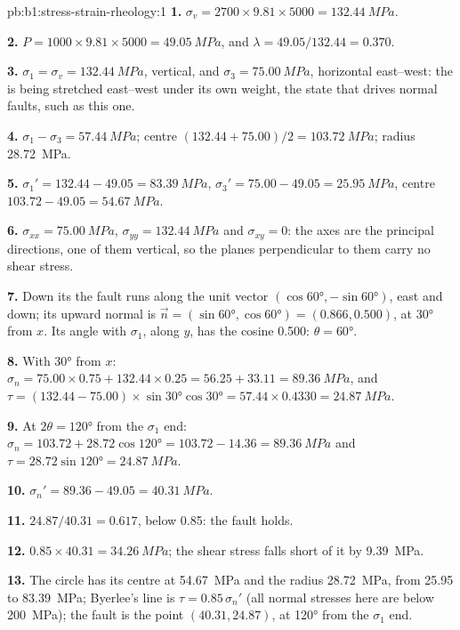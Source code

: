\begin{solution}{pb:b1:stress-strain-rheology:1}
\textbf{1.} $\sigma_v = 2700\times9.81\times5000 = \qty{132.44}{MPa}$.

\textbf{2.} $P = 1000\times9.81\times5000 = \qty{49.05}{MPa}$, and
$\lambda = 49.05/132.44 = 0.370$.

\textbf{3.} $\sigma_1 = \sigma_v = \qty{132.44}{MPa}$, vertical, and
$\sigma_3 = \qty{75.00}{MPa}$, horizontal east--west: the  is being
stretched east--west under its own weight, the state that drives normal
faults, such as this one.

\textbf{4.} $\sigma_1 - \sigma_3 = \qty{57.44}{MPa}$; centre
$(132.44 + 75.00)/2 = \qty{103.72}{MPa}$; radius \qty{28.72}{MPa}.

\textbf{5.} $\sigma_1' = 132.44 - 49.05 = \qty{83.39}{MPa}$, $\sigma_3' =
75.00 - 49.05 = \qty{25.95}{MPa}$, centre $103.72 - 49.05 = \qty{54.67}{MPa}$.

\textbf{6.} $\sigma_{xx} = \qty{75.00}{MPa}$, $\sigma_{yy} = \qty{132.44}{MPa}$
and $\sigma_{xy} = 0$: the axes are the principal directions, one of them
vertical, so the planes perpendicular to them carry no shear stress.

\textbf{7.} Down its  the fault runs along the unit vector
$(\cos\ang{60}, -\sin\ang{60})$, east and down; its upward normal is
$\vec n = (\sin\ang{60}, \cos\ang{60}) = (0.866, 0.500)$, at \ang{30} from
$x$. Its angle with $\sigma_1$, along $y$, has the cosine
0.500: $\theta = \ang{60}$.

\textbf{8.} With \ang{30} from $x$: $\sigma_n = 75.00\times0.75 + 132.44\times0.25
= 56.25 + 33.11 = \qty{89.36}{MPa}$, and $\tau = (132.44 - 75.00)\times
\sin\ang{30}\cos\ang{30} = 57.44\times0.4330 = \qty{24.87}{MPa}$.

\textbf{9.} At $2\theta = \ang{120}$ from the $\sigma_1$ end:
$\sigma_n = 103.72 + 28.72\cos\ang{120} = 103.72 - 14.36 = \qty{89.36}{MPa}$
and $\tau = 28.72\sin\ang{120} = \qty{24.87}{MPa}$.

\textbf{10.} $\sigma_n' = 89.36 - 49.05 = \qty{40.31}{MPa}$.

\textbf{11.} $24.87/40.31 = 0.617$, below 0.85: the fault holds.

\textbf{12.} $0.85\times40.31 = \qty{34.26}{MPa}$; the shear stress falls
short of it by \qty{9.39}{MPa}.

\textbf{13.} The circle has its centre at \qty{54.67}{MPa} and the radius
\qty{28.72}{MPa}, from \num{25.95} to \qty{83.39}{MPa}; Byerlee's line is
$\tau = 0.85\,\sigma_n'$ (all normal stresses here are below
\qty{200}{MPa}); the fault is the point $(40.31, 24.87)$, at \ang{120} from
the $\sigma_1$ end.


\end{solution}
